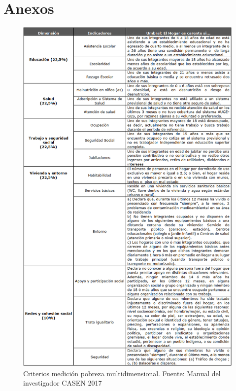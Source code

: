 \documentclass[12pt,letterpaper,spanish]{article}
\begin{document}
\newpage
{}




\newpage
 \vspace*{\fill}
\section*{\centering Anexos}
 \vspace*{\fill}
\newpage


\begin{figure}[H]
    \centering
        \includegraphics[height=\textheight]{Criterios carencias - Manual del investigador.png}
    \caption{Criterios medición pobreza multidimensional. Fuente: Manual del investigador CASEN 2017}
    \label{criterios}
\end{figure}
\newpage
\end{document}
